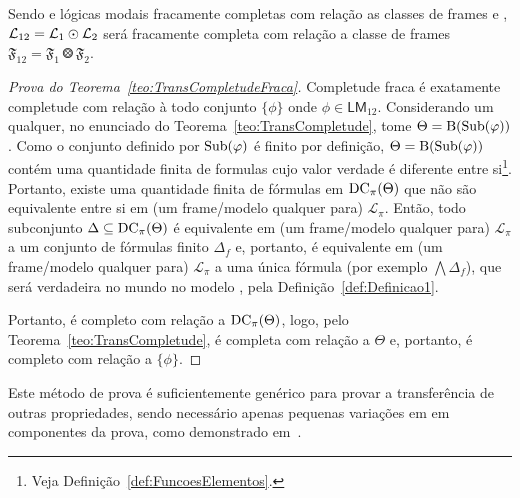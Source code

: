             \begin{teorema}
                \label{teo:TransCompletudeFraca}
                Sendo  e  lógicas modais fracamente completas com relação as classes de frames  e ,
                \(\mathcal{L}_{12} = \mathcal{L}_{1} \mathbin{\odot} \mathcal{L}_{2}\) será fracamente completa com relação a classe de frames \(\mathfrak{F}_{12} = \mathfrak{F}_1 \Otimes \mathfrak{F}_2\).
            \end{teorema}

            \begin{proof}[Prova do Teorema~\ref{teo:TransCompletudeFraca}]
                Completude fraca é exatamente completude com relação à todo conjunto \(\{\phi\}\) onde \(\phi \in \mathsf{LM}_{12}\). Considerando um \PHI qualquer, no
                enunciado do Teorema~\ref{teo:TransCompletude}, tome \(\Theta = \operatorname{B}(\operatorname{Sub}(\varphi))\). Como o conjunto definido por \(\operatorname{Sub}(\varphi)\) é finito por
                definição, \(\Theta = \operatorname{B}(\operatorname{Sub}(\varphi))\) contém uma quantidade finita de formulas cujo valor verdade é diferente entre si\footnote{Veja Definição~\ref{def:FuncoesElementos}.}.
                Portanto, existe uma quantidade finita de fórmulas em \(\operatorname{DC}_\pi(\Theta)\) que não são equivalente entre si em (um frame/modelo qualquer para) \(\mathcal{L}_\pi\).
                Então, todo subconjunto \(\Delta \subseteq \operatorname{DC}_\pi(\Theta)\) é equivalente em (um frame/modelo qualquer para) \(\mathcal{L}_\pi\) a um conjunto de fórmulas finito
                \(\Delta_f\) e, portanto, é equivalente em (um frame/modelo qualquer para) \(\mathcal{L}_\pi\) a uma única fórmula (por exemplo \(\bigwedge \Delta_f\)), que será
                verdadeira no mundo \Mundoinicial no modelo \Modeloinicial, pela Definição~\ref{def:Definicao1}.

                Portanto,  é completo com relação a \(\operatorname{DC}_\pi(\Theta)\), logo, pelo Teorema~\ref{teo:TransCompletude},  é completa
                com relação a \(\Theta\) e, portanto, é completo com relação a \(\{\phi\}\).
            \end{proof}

            Este método de prova é suficientemente genérico para provar a transferência de outras propriedades, sendo necessário apenas pequenas variações em
            em componentes da prova, como demonstrado em~.

